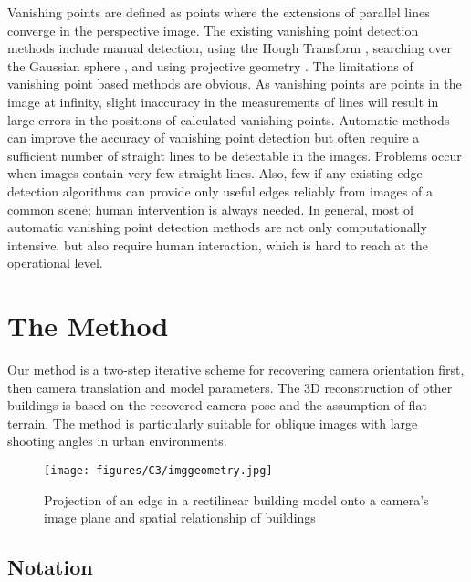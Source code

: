 Vanishing points are defined as points where the extensions of parallel lines converge in the perspective image. The existing vanishing point detection methods include manual detection, using the Hough Transform \cite{Tuytelaars98}, searching over the Gaussian sphere \cite{HeuvelFrank98}, and using projective geometry \cite{Birchfield98}. The limitations of vanishing point based methods are obvious. As vanishing points are points in the image at infinity, slight inaccuracy in the measurements of lines will result in large errors in the positions of calculated vanishing points. Automatic methods can improve the accuracy of vanishing point detection but often require a sufficient number of straight lines to be detectable in the images. Problems occur when images contain very few straight lines. Also, few if any existing edge detection algorithms can provide only useful edges reliably from images of a common scene; human intervention is always needed. In general, most of automatic vanishing point detection methods are not only computationally intensive, but also require human interaction, which is hard to reach at the operational level. 

\section{The Method}

Our method is a two-step iterative scheme for recovering camera orientation first, then camera translation and model parameters. The 3D reconstruction of other buildings is based on the recovered camera pose and the assumption of flat terrain. The method is particularly suitable for oblique images with large shooting angles in urban environments. 

\begin{figure}[H]
\centering
\texttt{[image: figures/C3/imggeometry.jpg]} \\
\caption{Projection of an edge in a rectilinear building model onto a camera’s image plane and spatial relationship of buildings} 
\label{fig:C3:imagegeometry}
\end{figure}

\subsection{Notation}

